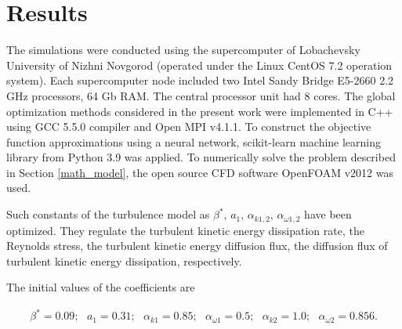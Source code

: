 \documentclass[mathematics,article,submit,pdftex,moreauthors]{Definitions/mdpi}
\begin{document}
\section{Results}





The simulations were conducted using the supercomputer of Lobachevsky University of Nizhni Novgorod (operated under the Linux CentOS 7.2 operation system). Each supercomputer node included two Intel Sandy Bridge E5-2660 2.2 GHz processors, 64 Gb RAM. The central processor unit had 8 cores. 
The global optimization methods considered in the present work were implemented in C++ using GCC 5.5.0 compiler and Open MPI v4.1.1. To construct the objective function approximations using a neural network, scikit-learn machine learning library from Python 3.9 was applied. 
To numerically solve the problem described in Section \ref{math_model}, the open source CFD software OpenFOAM v2012 \cite{OpenFOAM} was used.

Such constants of the turbulence model as $\beta^*$, $a_1$, $\alpha_{k 1,2}$, $\alpha_{\omega 1,2}$ have been optimized. They regulate the turbulent kinetic energy dissipation rate, the Reynolds stress, the turbulent kinetic energy diffusion flux, the diffusion flux of turbulent kinetic energy dissipation, respectively.

The initial values of the coefficients are

\begin{linenomath}
\begin{equation}
	\begin{aligned}
		\beta^* = 0.09;\ \ \ a_1 = 0.31;\ \ \ \alpha_{k 1} = 0.85;\ \ \ \alpha_{\omega 1} = 0.5; \ \ \ \alpha_{k 2} = 1.0;\ \ \ \alpha_{\omega 2} = 0.856.
	\end{aligned}
\end{equation}
\end{linenomath}
\end{document}
